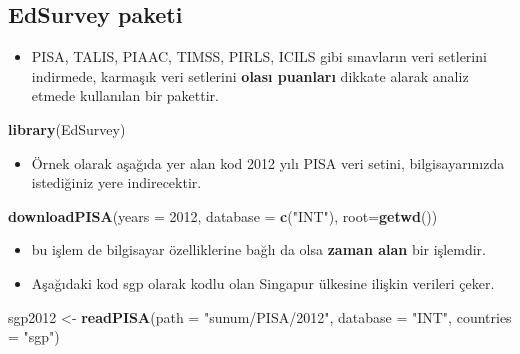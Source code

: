 \documentclass[
  oneside]{book}
\newenvironment{Shaded}{\begin{snugshade}}{\end{snugshade}}
\newcommand{\AttributeTok}[1]{\textcolor[rgb]{0.13,0.29,0.53}{#1}}
\newcommand{\DecValTok}[1]{\textcolor[rgb]{0.00,0.00,0.81}{#1}}
\newcommand{\FunctionTok}[1]{\textcolor[rgb]{0.13,0.29,0.53}{\textbf{#1}}}
\newcommand{\NormalTok}[1]{#1}
\newcommand{\OtherTok}[1]{\textcolor[rgb]{0.56,0.35,0.01}{#1}}
\newcommand{\StringTok}[1]{\textcolor[rgb]{0.31,0.60,0.02}{#1}}
\providecommand{\tightlist}{%
  \setlength{\itemsep}{0pt}\setlength{\parskip}{0pt}}
\begin{document}
\hypertarget{edsurvey-paketi}{%
\subsection{\texorpdfstring{\textbf{EdSurvey} paketi}{EdSurvey paketi}}\label{edsurvey-paketi}}

\begin{itemize}
\tightlist
\item
  PISA, TALIS, PIAAC, TIMSS, PIRLS, ICILS gibi sınavların veri setlerini indirmede, karmaşık veri setlerini \textbf{olası puanları} dikkate alarak analiz etmede kullanılan bir pakettir.
\end{itemize}

\begin{Shaded}
\begin{Highlighting}[]
\FunctionTok{library}\NormalTok{(EdSurvey)}
\end{Highlighting}
\end{Shaded}

\begin{itemize}
\tightlist
\item
  Örnek olarak aşağıda yer alan kod 2012 yılı PISA veri setini, bilgisayarınızda istediğiniz yere indirecektir.
\end{itemize}

\begin{Shaded}
\begin{Highlighting}[]
\FunctionTok{downloadPISA}\NormalTok{(}\AttributeTok{years =} \DecValTok{2012}\NormalTok{, }\AttributeTok{database =} \FunctionTok{c}\NormalTok{(}\StringTok{"INT"}\NormalTok{), }\AttributeTok{root=}\FunctionTok{getwd}\NormalTok{())}
\end{Highlighting}
\end{Shaded}

\begin{itemize}
\item
  bu işlem de bilgisayar özelliklerine bağlı da olsa \textbf{zaman alan} bir işlemdir.
\item
  Aşağıdaki kod sgp olarak kodlu olan Singapur ülkesine ilişkin verileri çeker.
\end{itemize}

\begin{Shaded}
\begin{Highlighting}[]
\NormalTok{sgp2012 }\OtherTok{\textless{}{-}} \FunctionTok{readPISA}\NormalTok{(}\AttributeTok{path =} \StringTok{"sunum/PISA/2012"}\NormalTok{, }\AttributeTok{database =} \StringTok{"INT"}\NormalTok{, }\AttributeTok{countries =} \StringTok{"sgp"}\NormalTok{)}
\end{Highlighting}
\end{Shaded}
\end{document}
